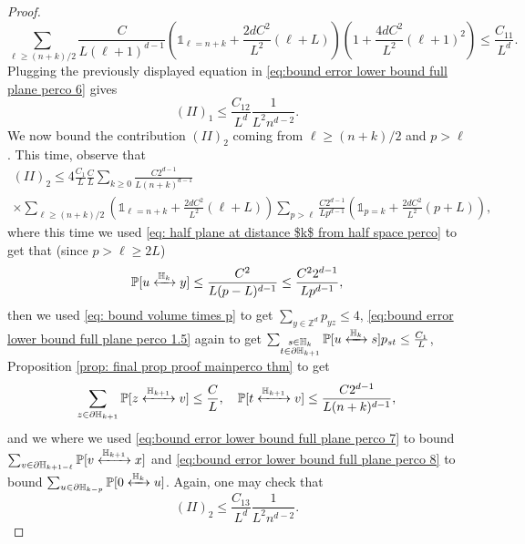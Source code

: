 \documentclass[11pt,a4paper]{article}
\numberwithin{equation}{section}
\theoremstyle{plain}
\theoremstyle{definition}
\newcommand{\connect}{\xleftrightarrow}
\begin{document}
\begin{proof}
\begin{equation}
	\sum_{\ell\geq (n+k)/2}\frac{C}{L(\ell+1)^{d-1}}\left(\mathds{1}_{\ell=n+k}+\frac{2dC^2}{L^2}(\ell+L)\right)\left(1+\frac{4dC^2}{L^2}(\ell+1)^2\right)\leq \frac{C_{11}}{L^d}.
\end{equation}
Plugging the previously displayed equation in \eqref{eq:bound error lower bound full plane perco 6} gives
\begin{equation}\label{eq: II 1}
	(II)_1\leq \frac{C_{12}}{L^d}\frac{1}{L^2n^{d-2}}.
\end{equation}
We now bound the contribution $(II)_2$ coming from $\ell\geq (n+k)/2$ and $p>\ell$. This time, observe that
\begin{multline}
	(II)_2\leq 4\frac{C_1}{L}\frac{C}{L}\sum_{k\geq 0} \frac{C2^{d-1}}{L(n+k)^{d-1}}\\\times\sum_{\ell \geq (n+k)/2}\left(\mathds{1}_{\ell=n+k}+\frac{2dC^2}{L^2}(\ell+L)\right)\sum_{p>\ell}\frac{C2^{d-1}}{L p^{d-1}}\left(\mathds{1}_{p=k}+\frac{2dC^2}{L^2}(p+L)\right),
\end{multline}
where this time we used \eqref{eq: half plane at distance $k$ from half space perco} to get that (since $p>\ell\geq 2L$)
\begin{equation}
	\mathbb P[u\connect{\mathbb H_k\:}y]\leq\frac{C^2}{L(p-L)^{d-1}}\leq \frac{C^22^{d-1}}{Lp^{d-1}},
\end{equation}
 then we used \eqref{eq: bound volume times p} to get $\sum_{y\in \mathbb Z^d}p_{yz}\leq 4$, \eqref{eq:bound error lower bound full plane perco 1.5} again to get $\sum_{\substack{s\in \mathbb H_k\\t\in \partial\mathbb H_{k+1}}}\mathbb P[u\connect{\mathbb H_k\:}s]p_{st}\leq \frac{C_1}{L}$, Proposition \ref{prop: final prop proof mainperco thm} to get 
 \begin{equation}
 	\sum_{z\in \partial\mathbb H_{k+1}}\mathbb P[z\connect{\mathbb H_{k+1}\:}v]\leq \frac{C}{L},\quad \mathbb P[t\connect{\mathbb H_{k+1}\:}v]\leq \frac{C2^{d-1}}{L(n+k)^{d-1}},
 \end{equation}
and we where we used \eqref{eq:bound error lower bound full plane perco 7} to bound $\sum_{v\in \partial \mathbb H_{k+1-\ell}}\mathbb P[v\connect{\mathbb H_{k+1}\:}x]$ and \eqref{eq:bound error lower bound full plane perco 8} to bound $\sum_{u\in \partial\mathbb H_{k-p}}\mathbb P[0\connect{\mathbb H_k\:}u]$.
 Again, one may check that
 \begin{equation}\label{eq: II 2}
 	(II)_2\leq \frac{C_{13}}{L^d}\frac{1}{L^2n^{d-2}}.
 \end{equation}


\end{proof}
\end{document}
